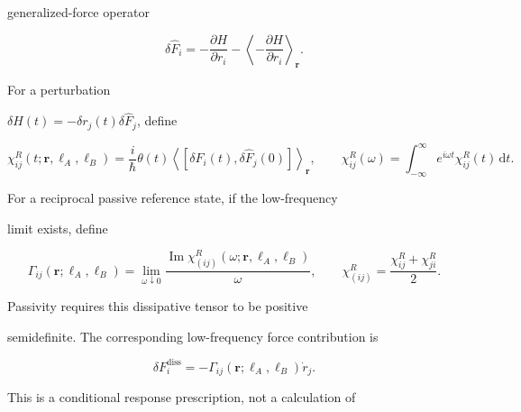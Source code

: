 generalized-force operator

\[

\delta\hat F_i

=

-\frac{\partial H}{\partial r_i}

-\left\langle-\frac{\partial H}{\partial r_i}\right\rangle_{\mathbf r}.

\]

For a perturbation

\(\delta H(t)=-\delta r_j(t)\delta\hat F_j\), define

\[

\chi^R_{ij}(t;\mathbf r,\ell_A,\ell_B)

=

\frac{i}{\hbar}\theta(t)

\left\langle[\delta\hat F_i(t),\delta\hat F_j(0)]\right\rangle_{\mathbf r},

\qquad

\chi^R_{ij}(\omega)

=

\int_{-\infty}^{\infty} e^{i\omega t}

\chi^R_{ij}(t)\,\mathrm dt .

\]

For a reciprocal passive reference state, if the low-frequency

limit exists, define

\[

\Gamma_{ij}(\mathbf r;\ell_A,\ell_B)

=

\lim_{\omega\downarrow0}

\frac{\operatorname{Im}\chi^R_{(ij)}

(\omega;\mathbf r,\ell_A,\ell_B)}{\omega},

\qquad

\chi^R_{(ij)}=\frac{\chi^R_{ij}+\chi^R_{ji}}{2}.

\]

Passivity requires this dissipative tensor to be positive

semidefinite. The corresponding low-frequency force contribution is

\[

\delta F_i^{\mathrm{diss}}

=

-\Gamma_{ij}(\mathbf r;\ell_A,\ell_B)\dot r_j.

\]

This is a conditional response prescription, not a calculation of

